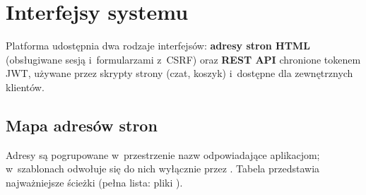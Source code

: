 \chapter{Interfejsy systemu}

Platforma udostępnia dwa rodzaje interfejsów: \textbf{adresy stron HTML} (obsługiwane
sesją i~formularzami z~CSRF) oraz \textbf{REST API} chronione tokenem JWT, używane przez
skrypty strony (czat, koszyk) i~dostępne dla zewnętrznych klientów.

\section{Mapa adresów stron}

Adresy są pogrupowane w~przestrzenie nazw odpowiadające aplikacjom; w~szablonach odwołuje
się do nich wyłącznie przez . Tabela przedstawia
najważniejsze ścieżki (pełna lista: pliki ).


